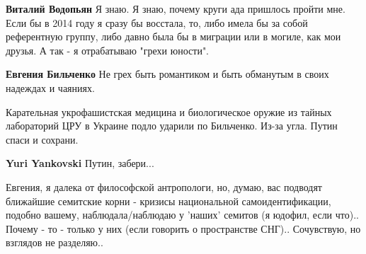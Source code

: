 \begin{itemize}
\begin{itemize}
\textbf{Виталий Водопьян} Я знаю. Я знаю, почему круги ада пришлось пройти мне. Если бы в 2014 году я сразу бы восстала, то, либо имела бы за собой референтную группу, либо давно была бы в миграции или в могиле, как мои друзья. А так - я отрабатываю "грехи юности".

 
\textbf{Евгения Бильченко} Не грех быть романтиком и быть обманутым в своих надеждах и чаяниях.
\end{itemize}

 

Карательная укрофашистская медицина и биологическое оружие из тайных
лабораторий ЦРУ в Украине подло ударили по Бильченко. Из-за угла. Путин спаси и
сохрани.

\begin{itemize}
 
\textbf{Yuri Yankovski} Путин, забери...
\end{itemize}

 

Евгения, я далека от философской антропологи, но, думаю, вас подводят ближайшие
семитские корни - кризисы национальной самоидентификации, подобно вашему,
наблюдала/наблюдаю у 'наших' семитов (я юдофил, если что).. Почему - то -
только у них (если говорить о пространстве СНГ).. Сочувствую, но взглядов не
разделяю..

\begin{itemize}
 

\end{itemize}
\end{itemize}

